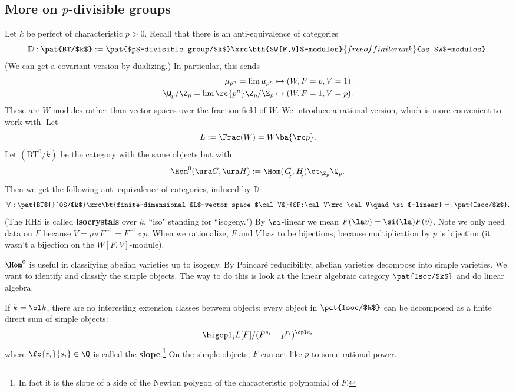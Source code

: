 \subsection{More on $p$-divisible groups}
Let $k$ be perfect of characteristic $p>0$. Recall that there is an anti-equivalence of categories
\[
\mathbb D:\pat{BT/$k$}:=\pat{$p$-divisible group/$k$}\xrc \bth{$W[F,V]$-modules}{free of finite rank}{as $W$-modules}.
\]
(We can get a covariant version by dualizing.)
In particular, this sends
\begin{align*}
\mu_{p^n}=\lim \mu_{p^n} &\mapsto (W, F=p, V=1)\\
\Q_p/\Z_p=\lim \rc{p^n} \Z_p/\Z_p & \mapsto (W, F=1,V=p).
\end{align*}
These are $W$-modules rather than vector spaces over the fraction field of $W$. We introduce a rational version, which is more convenient to work with.
Let 
\[
L:=\Frac(W)=W\ba{\rc p}.
\]
Let $(\text{BT}^0/k)$ be the category with the same objects but with 
\[
\Hom^0(\ura G,\ura H):=\Hom(\underrightarrow{G},\underrightarrow{H})\ot_{\Z_p} \Q_p.
\]
Then we get the following anti-equivalence of categories, induced by $\mathbb D$:
\[\mathbb V:
\pat{BT${}^0$/$k$}\xrc
\bt{finite-dimensional $L$-vector space $\cal V$}{$F:\cal V\xrc \cal V\quad \si$-linear}=:\pat{Isoc/$k$}.
\]
(The RHS is called \textbf{isocrystals} over $k$, ``iso" standing for ``isogeny.")
By $\si$-linear we mean $F(\la v)=\si(\la)F(v)$. Note we only need data on $F$ because $V=p\circ F^{-1}=F^{-1}\circ p$. When we rationalize, $F$ and $V$ has to be bijections, because multiplication by $p$ is bijection (it wasn't a bijection on the $W[F,V]$-module).

$\Hom^0$ is useful in classifying abelian varieties up to isogeny. By Poincar\'e reducibility, abelian varieties decompose into simple varieties. %
We want to identify and classify the simple objects. The way to do this is look at the linear algebraic category $\pat{Isoc/$k$}$ and do linear algebra.

If $k=\ol k$, there are no interesting extension classes between objects; every object in $\pat{Isoc/$k$}$ can be decomposed as a finite direct sum of simple objects:
\[
\bigopl_{i} L[F]/(F^{s_i}-p^{r_i})^{\opl e_i}
\]
where $\fc{r_i}{s_i}\in \Q$ is called the \textbf{slope}.\footnote{In fact it is the slope of a side of the Newton polygon of the characteristic polynomial of $F$.}  
On the simple objects, $F$ can act like $p$ to some rational power. 


